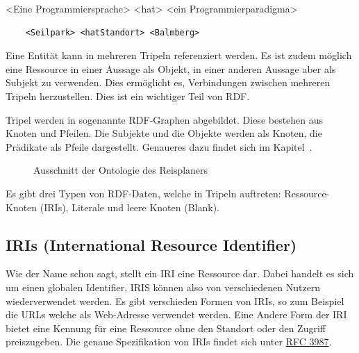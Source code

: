 \noindent\hspace*{15mm} <Eine Programmiersprache> <hat> <ein Programmierparadigma>
\begin{lstlisting}
    <Seilpark> <hatStandort> <Balmberg>
\end{lstlisting}

Eine Entität kann in mehreren Tripeln referenziert werden. Es ist zudem möglich eine Ressource in einer Aussage als Objekt, in einer anderen Aussage aber als Subjekt zu verwenden. Dies ermöglicht es, Verbindungen zwischen mehreren Tripeln herzustellen. Dies ist ein wichtiger Teil von RDF.

\newpage

Tripel werden in sogenannte RDF-Graphen abgebildet. Diese bestehen aus Knoten und Pfeilen. Die Subjekte und die Objekte werden als Knoten, die Prädikate als Pfeile dargestellt. Genaueres dazu findet sich im Kapitel~.

\begin{figure}[H]
\centering {}
\caption{Ausschnitt der Ontologie des Reisplaners\label{fig:rdf_reiseplaner_ontologie}\protect\footnotemark}
\end{figure}

Es gibt drei Typen von RDF-Daten, welche in Tripeln auftreten: Ressource-Knoten (IRIs), Literale und leere Knoten (Blank).

\subsection{IRIs (International Resource Identifier)}
\label{sec:rdf_rdf_dataModel_iris}
Wie der Name schon sagt, stellt ein IRI eine Ressource dar. Dabei handelt es sich um einen globalen Identifier, IRIS können also von verschiedenen Nutzern wiederverwendet werden. Es gibt verschieden Formen von IRIs, so zum Beispiel die URLs welche als Web-Adresse verwendet werden. Eine Andere Form der IRI bietet eine Kennung für eine Ressource ohne den Standort oder den Zugriff preiszugeben. Die genaue Spezifikation von IRIs findet sich unter \href{http://www.ietf.org/rfc/rfc3987.txt}{RFC 3987}.

